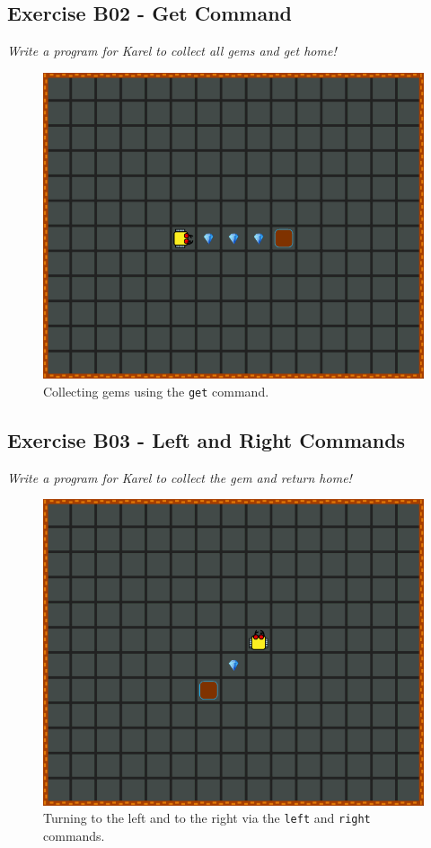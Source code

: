 \documentclass[article,A4,12pt]{llncs}
\begin{document}
\subsection{Exercise B02 - Get Command}

{\em Write a program for Karel to collect all gems and get home! 

\begin{figure}[!ht]
\begin{center}
\includegraphics[height=0.4\textwidth]{img/b02.png}
\end{center}
\vspace{-4mm}
\caption{Collecting gems using the {\tt get} command.}
\label{fig:b02}
\vspace{-4mm}
\end{figure}
\noindent

\newpage

\subsection{Exercise B03 - Left and Right Commands}

{\em Write a program for Karel to collect the gem and return home! 

\begin{figure}[!ht]
\begin{center}
\includegraphics[height=0.4\textwidth]{img/b03.png}
\end{center}
\vspace{-4mm}
\caption{Turning to the left and to the right via the {\tt left} and {\tt right} commands.}
\label{fig:b03}
\vspace{-4mm}
\end{figure}
\noindent

}}
\end{document}
